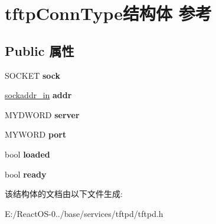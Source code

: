 \hypertarget{structtftp_conn_type}{}\section{tftp\+Conn\+Type结构体 参考}
\label{structtftp_conn_type}
\subsection*{Public 属性}
\begin{DoxyCompactItemize}
\item 
\mbox{\label{structtftp_conn_type_a257ea8b766432fd0ad1a6a6a45644c51}} 
S\+O\+C\+K\+ET {\bfseries sock}
\item 
\mbox{\label{structtftp_conn_type_ace1f57be56130e134630ee5ff39611a5}} 
\hyperlink{structsockaddr__in}{sockaddr\+\_\+in} {\bfseries addr}
\item 
\mbox{\label{structtftp_conn_type_a368a083d9841f382b3ac5a673b7292a8}} 
M\+Y\+D\+W\+O\+RD {\bfseries server}
\item 
\mbox{\label{structtftp_conn_type_a0c4dd7759d4ba7f321ccf9dbef5f0c21}} 
M\+Y\+W\+O\+RD {\bfseries port}
\item 
\mbox{\label{structtftp_conn_type_a1068b99652c892917adb9878b56332fb}} 
bool {\bfseries loaded}
\item 
\mbox{\label{structtftp_conn_type_a94d07ecf595bcd85a50b814dd133259e}} 
bool {\bfseries ready}
\end{DoxyCompactItemize}


该结构体的文档由以下文件生成\+:\begin{DoxyCompactItemize}
\item 
E\+:/\+React\+O\+S-\/0../base/services/tftpd/tftpd.\+h\end{DoxyCompactItemize}
